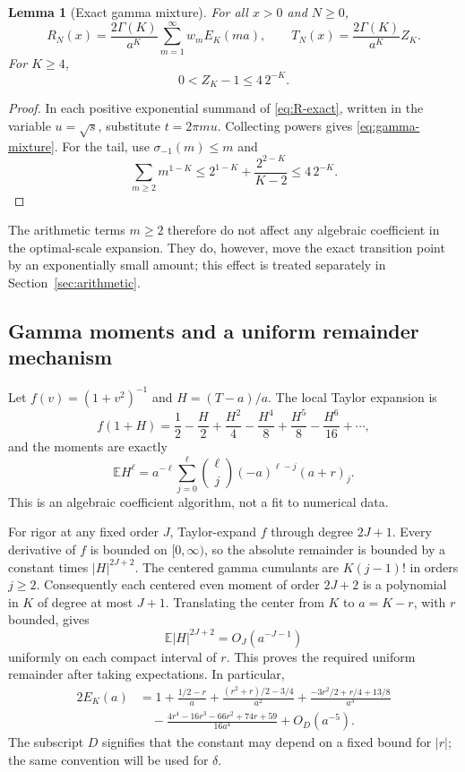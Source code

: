 \documentclass[11pt]{article}
\numberwithin{equation}{section}
\newtheorem{lemma}[theorem]{Lemma}
\theoremstyle{definition}
\theoremstyle{remark}
\newcommand{\E}{\mathbb E}
\begin{document}
\begin{lemma}[Exact gamma mixture]\label{lem:gamma-mixture}
For all $x>0$ and $N\ge0$,
\begin{equation}\label{eq:gamma-mixture}
 R_N(x)=\frac{2\Gamma(K)}{a^K}\sum_{m=1}^\infty w_m E_K(ma),
 \qquad T_N(x)=\frac{2\Gamma(K)}{a^K}Z_K.
\end{equation}
For $K\ge4$,
\begin{equation}\label{eq:frequency-tail}
 0<Z_K-1\le4\,2^{-K}.
\end{equation}
\end{lemma}
\begin{proof}
In each positive exponential summand of \eqref{eq:R-exact}, written
in the variable $u=\sqrt s$, substitute $t=2\pi m u$. Collecting
powers gives \eqref{eq:gamma-mixture}. For the tail, use
$\sigma_{-1}(m)\le m$ and
\[
 \sum_{m\ge2}m^{1-K}
 \le 2^{1-K}+\frac{2^{2-K}}{K-2}\le4\,2^{-K}.
\]
\end{proof}

The arithmetic terms $m\ge2$ therefore do not affect any algebraic
coefficient in the optimal-scale expansion. They do, however, move
the exact transition point by an exponentially small amount; this
effect is treated separately in Section~\ref{sec:arithmetic}.

\subsection{Gamma moments and a uniform remainder mechanism}

Let $f(v)=(1+v^2)^{-1}$ and $H=(T-a)/a$. The local Taylor expansion is
\[
 f(1+H)=\frac12-\frac H2+\frac{H^2}4-\frac{H^4}8
                +\frac{H^5}8-\frac{H^6}{16}+\cdots,
\]
and the moments are exactly
\begin{equation}\label{eq:gamma-moments}
 \E H^\ell
 =a^{-\ell}\sum_{j=0}^{\ell}
       \binom{\ell}{j}(-a)^{\ell-j}(a+r)_j.
\end{equation}
This is an algebraic coefficient algorithm, not a fit to numerical data.

For rigor at any fixed order $J$, Taylor-expand $f$ through degree
$2J+1$. Every derivative of $f$ is bounded on $[0,\infty)$, so the
absolute remainder is bounded by a constant times $|H|^{2J+2}$.
The centered gamma cumulants are $K(j-1)!$ in orders $j\ge2$.
Consequently each centered even moment of order $2J+2$ is a polynomial
in $K$ of degree at most $J+1$. Translating the center from $K$ to
$a=K-r$, with $r$ bounded, gives
\[
 \E|H|^{2J+2}=O_J(a^{-J-1})
\]
uniformly on each compact interval of $r$. This proves the required
uniform remainder after taking expectations. In particular,
\begin{align}
 2E_K(a)
 &=1+\frac{1/2-r}{a}
   +\frac{(r^2+r)/2-3/4}{a^2}
   +\frac{-3r^2/2+r/4+13/8}{a^3}\nonumber\\
 &\quad-\frac{4r^4-16r^3-66r^2+74r+59}{16a^4}
   +O_D(a^{-5}).\label{eq:gamma-expansion}
\end{align}
The subscript $D$ signifies that the constant may depend on a fixed
bound for $|r|$; the same convention will be used for $\delta$.
\end{document}
